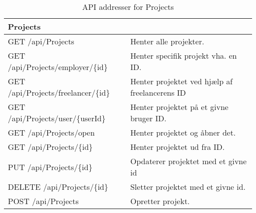 \begin{table}[H]
	\centering
	\caption{API addresser for Projects}
	\label{tab:web_user}
	\begin{tabular}{p{5cm}|p{11cm}}
		\hline
		\multicolumn{2}{l}{\textbf{Projects}}\\
		\hline
		GET \newline
		/api/Projects & Henter alle projekter.\\
        \hline
        GET \newline
		/api/Projects/employer/\{id\} & Henter specifik projekt vha. en ID. \\
        \hline
        GET \newline
		/api/Projects/freelancer/\{id\} & Henter projektet ved hjælp af freelancerens ID \\
        \hline
        GET \newline
		/api/Projects/user/\{userId\} & Henter projektet på et givne bruger ID.\\
        \hline
        GET \newline
		/api/Projects/open & Henter projektet og åbner det.\\
        \hline
        GET \newline
		/api/Projects/\{id\} & Henter projektet ud fra ID.\\
		\hline
		PUT \newline
		/api/Projects/\{id\} & Opdaterer projektet med et givne id \\
		\hline
		DELETE \newline
		/api/Projects/\{id\} & Sletter projektet med et givne id. \\
		\hline
		POST \newline
		/api/Projects & Opretter projekt.\\
		\hline
	\end{tabular}
\end{table}
\newpage
